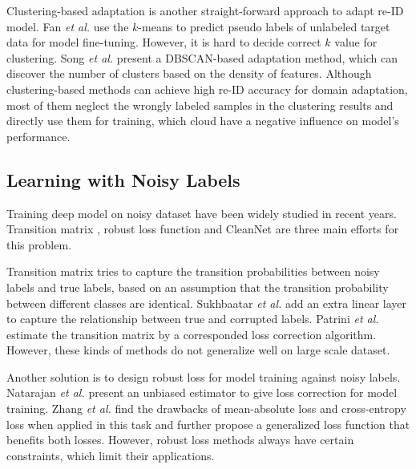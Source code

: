 \documentclass[letterpaper]{article} \usepackage{aaai20}  \usepackage{times}  \usepackage{helvet} \usepackage{courier}  \usepackage[hyphens]{url}  \usepackage{graphicx} \urlstyle{rm} \def\UrlFont{\rm}  \usepackage{graphicx}  \frenchspacing  \setlength{\pdfpagewidth}{8.5in}  \setlength{\pdfpageheight}{11in}  \usepackage{color}
\begin{document}
Clustering-based adaptation is another straight-forward approach to adapt re-ID model. Fan \textit{et al.} \cite{fan2017unsupervised} use the $k$-means \cite{lloyd1982least} to predict pseudo labels of unlabeled target data for model fine-tuning. However, it is hard to decide correct $k$ value for clustering. Song \textit{et al.} \cite{song2018unsupervised} present a DBSCAN-based adaptation method, which can discover the number of clusters based on the density of features. Although clustering-based methods can achieve high re-ID accuracy for domain adaptation, most of them neglect the wrongly labeled samples in the clustering results and directly use them for training, which cloud have a negative influence on model's performance.

\subsection{Learning with Noisy Labels}

Training deep model on noisy dataset have been widely studied in recent years. Transition matrix \cite{sukhbaatar2014training,patrini2017making}, robust loss function \cite{natarajan2013learning,zhang2018generalized} and CleanNet \cite{lee2018cleannet} are three main efforts for this problem. 

Transition matrix tries to capture the transition probabilities between noisy labels and true labels, based on an assumption that the transition probability between different classes are identical. Sukhbaatar \textit{et al.} \cite{sukhbaatar2014training} add an extra linear layer to capture the relationship between true and corrupted labels. Patrini \textit{et al.} \cite{patrini2017making} estimate the transition matrix by a corresponded loss correction algorithm. However, these kinds of methods do not generalize well on large scale dataset.

Another solution is to design robust loss for model training against noisy labels. Natarajan \textit{et al.} \cite{natarajan2013learning} present an unbiased estimator to give loss correction for model training. Zhang \emph{et al.} \cite{zhang2018generalized} find the drawbacks of mean-absolute loss and cross-entropy loss when applied in this task and further propose a generalized loss function that benefits both losses. However, robust loss methods always have certain constraints, which limit their applications.
\end{document}
